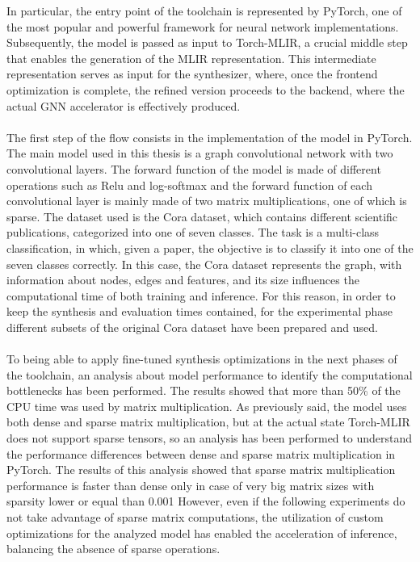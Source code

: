\documentclass{article}
\begin{document}
In particular, the entry point of the toolchain is represented by PyTorch, one of the most popular and powerful framework for neural network implementations. 
Subsequently, the model is passed as input to Torch-MLIR, a crucial middle step that enables the generation of the MLIR representation. 
This intermediate representation serves as input for the synthesizer, where, once the frontend optimization is complete, the refined version proceeds to the backend, where the actual GNN accelerator is effectively produced. 
\\
\\
\noindent
The first step of the flow consists in the implementation of the model in PyTorch. 
The main model used in this thesis is a graph convolutional network with two convolutional layers. The forward function of the model is made of different operations such as Relu and log-softmax and the forward function of each convolutional layer is mainly made of two matrix multiplications, one of which is sparse.
The dataset used is the Cora dataset, which contains different scientific publications, categorized into one of seven classes.
The task is a multi-class classification, in which, given a paper, the objective is to classify it into one of the seven classes correctly. 
In this case, the Cora dataset represents the graph, with information about nodes, edges and features, and its size influences the computational time of both training and inference. 
For this reason, in order to keep the synthesis and evaluation times contained, for the experimental phase different subsets of the original Cora dataset have been prepared and used.
\\
\\
\noindent
To being able to apply fine-tuned synthesis optimizations in the next phases of the toolchain, an analysis about model performance to identify the computational bottlenecks has been performed.
The results showed that more than 50\% of the CPU time was used by matrix multiplication. 
As previously said, the model uses both dense and sparse matrix multiplication, but at the actual state Torch-MLIR does not support sparse tensors, so an analysis has been performed to understand the performance differences between dense and sparse matrix multiplication in PyTorch.
The results of this analysis showed that sparse matrix multiplication performance is faster than dense only in case of very big matrix sizes with sparsity lower or equal than 0.001%
However, even if the following experiments do not take advantage of sparse matrix computations, 
the utilization of custom optimizations for the analyzed model has enabled the acceleration of inference, balancing the absence of sparse operations.
\end{document}
